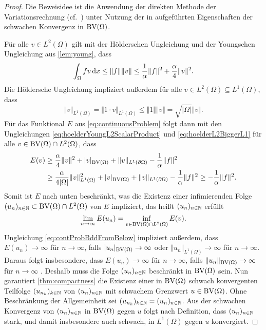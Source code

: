 \begin{proof}
  Die Beweisidee ist die Anwendung der direkten Methode der Variationsrechnung
  (cf.\ \cite{Dac89}) unter Nutzung der in 
  aufgeführten Eigenschaften der schwachen Konvergenz in $\textup{BV}(\Omega)$.

  Für alle $v\in L^2(\Omega)$ gilt mit der Hölderschen
  Ungleichung und der Youngschen Ungleichung aus \cref{lem:young}, dass
  \begin{equation}
    \label{eq:hoelderYoungL2ScalarProduct}
    \int_\Omega fv\,\mathrm{d}x
    \leq 
    \Vert f\Vert\Vert v\Vert
    \leq 
    \frac{1}{\alpha}\Vert f\Vert^2 + \frac{\alpha}{4}\Vert v\Vert^2.
  \end{equation}
  Die Höldersche Ungleichung impliziert außerdem für alle $v\in
  L^2(\Omega)\subseteq L^1(\Omega)$, dass
  \begin{equation}\label{eq:hoelderL2BiggerL1}
    \Vert v\Vert_{L^1(\Omega)} 
    = \Vert 1\cdot v\Vert_{L^1(\Omega)}
    \leq \Vert 1\Vert\Vert v\Vert
    =\sqrt{|\Omega|} \Vert v\Vert.
  \end{equation}
  Für das Funktional $E$ aus \eqref{eq:continuousProblem} folgt dann mit den
  Ungleichungen \eqref{eq:hoelderYoungL2ScalarProduct} und
  \eqref{eq:hoelderL2BiggerL1} für alle $v\in \textup{BV}(\Omega)\cap L^2(\Omega)$,
  dass
  \begin{equation}
    \label{eq:contProbBddFromBelow}
    \begin{aligned}
      E(v)
      &\geq 
      \frac{\alpha}{4}\Vert v\Vert^2 + |v|_{\textup{BV}(\Omega)}
      +\Vert v\Vert_{L^1(\partial\Omega)}-\frac{1}{\alpha}\Vert
      f\Vert^2\\
      &\geq 
      \frac{\alpha}{4|\Omega|}\Vert v\Vert_{L^1(\Omega)}^2 + |v|_{\textup{BV}(\Omega)}
      +\Vert v\Vert_{L^1(\partial\Omega)}-\frac{1}{\alpha}\Vert
      f\Vert^2
      \geq -\frac{1}{\alpha}\Vert f\Vert^2.
    \end{aligned}
  \end{equation}
  Somit ist $E$ nach unten beschränkt, was die Existenz einer infimierenden
  Folge $(u_n)_{n\in\mathbb{N}}\subset\textup{BV}(\Omega)\cap L^2(\Omega)$ von $E$ 
  impliziert, das heißt
  $(u_n)_{n\in\mathbb{N}}$ erfüllt $$\lim_{n\rightarrow\infty}E(u_n) =
  \inf_{v\in\textup{BV}(\Omega)\cap L^2(\Omega)}E(v).$$ 
  Ungleichung \eqref{eq:contProbBddFromBelow} impliziert außerdem, dass
  $E(u_n)\to\infty$ für $n\to\infty$, falls $|u_n|_{\textup{BV}(\Omega)}\to\infty$ oder
  $\Vert u_n\Vert_{L^1(\Omega)}\to\infty$ für $n\to\infty$. 
  Daraus folgt insbesondere, dass $E(u_n)\to\infty$ für $n\to\infty$, falls
  $\Vert u_n\Vert_{\textup{BV}(\Omega)}\to\infty$ für $n\to\infty$ .
  Deshalb muss die Folge $(u_n)_{n\in\mathbb{N}}$ beschränkt in $\textup{BV}(\Omega)$ sein.
  Nun garantiert \cref{thm:compactness} die Existenz einer in $\textup{BV}(\Omega)$
  schwach konvergenten Teilfolge $(u_{n_k})_{k\in\mathbb{N}}$ von $(u_n)_{n\in\mathbb{N}}$
  mit schwachem Grenzwert $u\in\textup{BV}(\Omega)$. 
  Ohne Beschränkung der Allgemeinheit sei
  $(u_{n_k})_{k\in\mathbb{N}}=(u_n)_{n\in\mathbb{N}}$.
  Aus der schwachen Konvergenz von $(u_n)_{n\in\mathbb{N}}$ in $\textup{BV}(\Omega)$ gegen
  $u$ folgt nach Definition, dass $(u_n)_{n\in\mathbb{N}}$ stark, und damit
  insbesondere auch schwach, in $L^1(\Omega)$ gegen $u$ konvergiert.


\end{proof}
